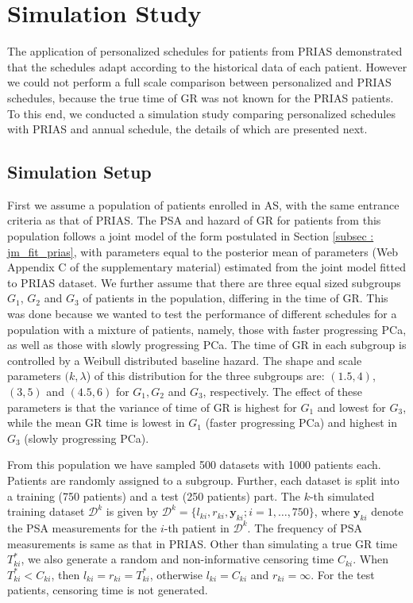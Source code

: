 \section{Simulation Study}
\label{sec: simulation_study}
The application of personalized schedules for patients from PRIAS demonstrated that the schedules adapt according to the historical data of each patient. However we could not perform a full scale comparison between personalized and PRIAS schedules, because the true time of GR was not known for the PRIAS patients. To this end, we conducted a simulation study comparing personalized schedules with PRIAS and annual schedule, the details of which are presented next.

\subsection{Simulation Setup}
\label{subsec : simulation_setup}
First we assume a population of patients enrolled in AS, with the same entrance criteria as that of PRIAS. The PSA and hazard of GR for patients from this population follows a joint model of the form postulated in Section \ref{subsec : jm_fit_prias}, with parameters equal to the posterior mean of parameters (Web Appendix C of the supplementary material) estimated from the joint model fitted to PRIAS dataset. We further assume that there are three equal sized subgroups $G_1$, $G_2$ and $G_3$ of patients in the population, differing in the time of GR. This was done because we wanted to test the performance of different schedules for a population with a mixture of patients, namely, those with faster progressing PCa, as well as those with slowly progressing PCa. The time of GR in each subgroup is controlled by a Weibull distributed baseline hazard. The shape and scale parameters $(k, \lambda$) of this distribution for the three subgroups are: $(1.5, 4)$, $(3, 5)$ and $(4.5, 6)$ for $G_1, G_2$ and $G_3$, respectively. The effect of these parameters is that the variance of time of GR is highest for $G_1$ and lowest for $G_3$, while the mean GR time is lowest in $G_1$ (faster progressing PCa) and highest in $G_3$ (slowly progressing PCa).

From this population we have sampled 500 datasets with 1000 patients each. Patients are randomly assigned to a subgroup. Further, each dataset is split into a training (750 patients) and a test (250 patients) part. The $k$-th simulated training dataset $\mathcal{D}^k$ is given by $\mathcal{D}^k = \{l_{ki}, r_{ki}, \boldsymbol{y}_{ki}; i = 1, \ldots, 750\}$, where $\boldsymbol{y}_{ki}$ denote the PSA measurements for the $i$-th patient in $\mathcal{D}^k$. The frequency of PSA measurements is same as that in PRIAS. Other than simulating a true GR time $T^*_{ki}$, we also generate a random and non-informative censoring time $C_{ki}$. When $T^*_{ki} < C_{ki}$, then $l_{ki} = r_{ki} = T^*_{ki}$, otherwise $l_{ki} = C_{ki}$ and $r_{ki} = \infty$. For the test patients, censoring time is not generated.

